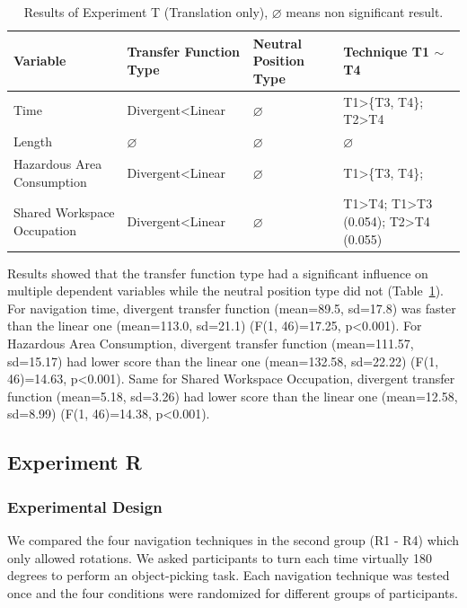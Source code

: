 \begin{table}[hbt]
\renewcommand{\arraystretch}{1.3}
\caption{Results of Experiment T (Translation only), $\varnothing$ means non significant result.}
\label{tab:4_result_t1}
\centering
\small
\begin{tabular}{p{3cm} l l p{4.5cm}}
  \hline
  Variable & Transfer Function Type & Neutral Position Type & Technique T1 $\sim$ T4 \\
  \hline
  Time & Divergent\textless Linear & $\varnothing$ & T1\textgreater \{T3, T4\}; T2\textgreater T4 \\
  Length & $\varnothing$ & $\varnothing$ & $\varnothing$ \\
  Hazardous Area Consumption & Divergent\textless Linear & $\varnothing$ & T1\textgreater \{T3, T4\}; \\
  Shared Workspace Occupation & Divergent\textless Linear & $\varnothing$ & T1\textgreater T4; T1\textgreater T3 (0.054); T2\textgreater T4 (0.055) \\
  \hline
\end{tabular}
\end{table}

Results showed that the transfer function type had a significant influence on multiple dependent variables while the neutral position type did not (Table~\ref{tab:4_result_t1}). For navigation time, divergent transfer function (mean=89.5, sd=17.8) was faster than the linear one (mean=113.0, sd=21.1) (F(1, 46)=17.25, p\textless 0.001). For Hazardous Area Consumption, divergent transfer function (mean=111.57, sd=15.17) had lower score than the linear one (mean=132.58, sd=22.22) (F(1, 46)=14.63, p\textless 0.001). Same for Shared Workspace Occupation, divergent transfer function (mean=5.18, sd=3.26) had lower score than the linear one (mean=12.58, sd=8.99) (F(1, 46)=14.38, p\textless 0.001).


\subsection{Experiment R}
\subsubsection{Experimental Design}
We compared the four navigation techniques in the second group (R1 - R4) which only allowed rotations. We asked participants to turn each time virtually 180 degrees to perform an object-picking task. Each navigation technique was tested once and the four conditions were randomized for different groups of participants.

